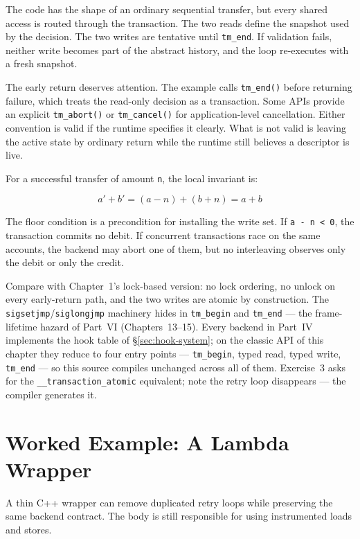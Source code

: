 The code has the shape of an ordinary sequential transfer, but every shared access is routed through the transaction. The two reads define the snapshot used by the decision. The two writes are tentative until \texttt{tm\_end}. If validation fails, neither write becomes part of the abstract history, and the loop re-executes with a fresh snapshot.

The early return deserves attention. The example calls \texttt{tm\_end()} before returning failure, which treats the read-only decision as a transaction. Some APIs provide an explicit \texttt{tm\_abort()} or \texttt{tm\_cancel()} for application-level cancellation. Either convention is valid if the runtime specifies it clearly. What is not valid is leaving the active state by ordinary return while the runtime still believes a descriptor is live.

For a successful transfer of amount \texttt{n}, the local invariant is:

$$
a' + b' = (a - n) + (b + n) = a + b
$$

The floor condition is a precondition for installing the write set. If \texttt{a - n < 0}, the transaction commits no debit. If concurrent transactions race on the same accounts, the backend may abort one of them, but no interleaving observes only the debit or only the credit.

Compare with Chapter~1's lock-based version: no lock ordering, no unlock on every early-return path, and the two writes are atomic by construction. The \texttt{sigsetjmp}/\texttt{siglongjmp} machinery hides in \texttt{tm\_begin} and \texttt{tm\_end} --- the frame-lifetime hazard of Part~VI (Chapters~13--15). Every backend in Part~IV implements the hook table of \S\ref{sec:hook-system}; on the classic API of this chapter they reduce to four entry points --- \texttt{tm\_begin}, typed read, typed write, \texttt{tm\_end} --- so this source compiles unchanged across all of them. Exercise~3 asks for the \texttt{\_\_transaction\_atomic} equivalent; note the retry loop disappears --- the compiler generates it.

\section{Worked Example: A Lambda Wrapper}

A thin C++ wrapper can remove duplicated retry loops while preserving the same
backend contract. The body is still responsible for using instrumented loads and
stores.

